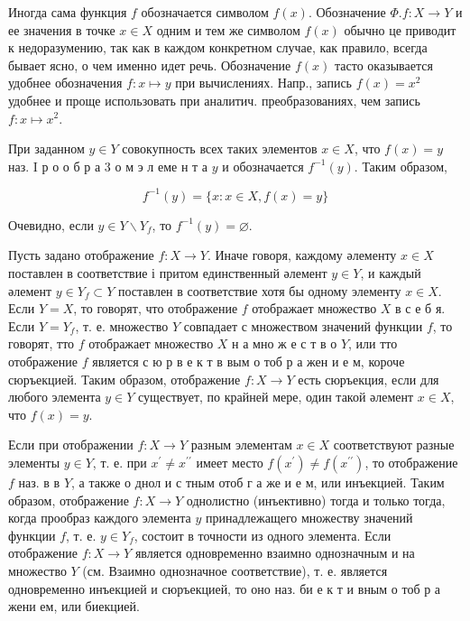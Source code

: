 \documentclass[10pt]{article}
\begin{document}
Иногда сама функция $f$ обозначается символом $f(x)$. Обозначение $\Phi . f: X \longrightarrow Y$ и ее значения в точке $x \in X$ одним и тем же символом $f(x)$ обычно це приводит к недоразумению, так как в каждом конкретном случае, как правило, всегда бывает ясно, о чем именно идет речь. Обозначение $f(x)$ тасто оказывается удобнее обозначения $f: x \longmapsto y$ при вычислениях. Напр., запись $f(x)=x^{2}$ удобнее и проще использовать при аналитич. преобразованиях, чем запись $f: x \longmapsto x^{2}$.



При заданном $y \in Y$ совокупность всех таких элементов $x \in X$, что $f(x)=y$ наз. I р о о б р а 3 о м э л еме н т а $y$ и обозначается $f^{-1}(y)$. Таким образом,



\[

f^{-1}(y)=\{x: x \in X, f(x)=y\}

\]



Очевидно, если $y \in Y \backslash Y_{f}$, то $f^{-1}(y)=\varnothing$.



Пусть задано отображение $f: X \longrightarrow Y$. Иначе говоря, каждому әлементу $x \in X$ поставлен в соответствие і притом единственный әлемент $y \in Y$, и каждый әлемент $y \in Y_{f} \subset Y$ поставлен в соответствие хотя бы одному элементу $x \in X$. Если $Y=X$, то говорят, что отображение $f$ отображает множество $X$ в с е б я. Если $Y=Y_{f}$, т. е. множество $Y$ совпадает с множеством значений функции $f$, то говорят, тто $f$ отображает множество $X$ н а мно ж е с т в о $Y$, или тто отображение $f$ является с ю р в е к т в вым о тоб р а жен и е м, короче сюръекцией. Таким образом, отображение $f: X \longrightarrow Y$ есть сюръекция, если для любого элемента $y \in Y$ существует, по крайней мере, один такой әлемент $x \in X$, что $f(x)=y$.



Если при отображении $f: X \longrightarrow Y$ разным элементам $x \in X$ соответствуют разные элементы $y \in Y$, т. е. при $x^{\prime} \neq x^{\prime \prime}$ имеет место $f\left(x^{\prime}\right) \neq f\left(x^{\prime \prime}\right)$, то отображение $f$ наз. в в $Y$, а также о днол и с тным отоб г а же и е м, или инъекцией. Таким образом, отображение $f: X \longrightarrow Y$ однолистно (инъективно) тогда и только тогда, когда прообраз каждого элемента $y$ принадлежащего множеству значений функции $f$, т. е. $y \in Y_{f}$, состоит в точности из одного элемента. Если отображение $f: X \longrightarrow Y$ является одновременно взаимно однозначным и на множество $Y$ (см. Взаимно однозначное соответствие), т. е. является одновременно инъекцией и сюръекцией, то оно наз. би е к т и вным о тоб р а жени ем, или биекцией.
\end{document}
